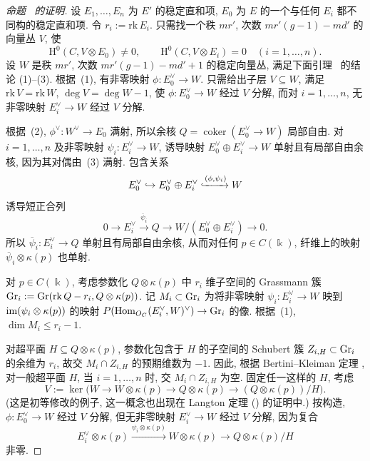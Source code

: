 \begin{proof}[命题~ 的证明]
设 $E_1,\ldots,E_n$ 为 $E'$ 的稳定直和项, $E_0$ 为 $E$ 的一个与任何 $E_i$ 都不同构的稳定直和项. 令 $r_i:=\mathrm{rk}\,E_i$. 只需找一个秩 $mr'$, 次数 $mr'(g-1)-md'$ 的向量丛 $V$, 使
\[
\mathrm H^0(C,V\otimes E_0)\neq0,\qquad\mathrm H^0(C,V\otimes E_i)=0\quad(i=1,\ldots,n).
\]
设 $W$ 是秩 $mr'$, 次数 $mr'(g-1)-md'+1$ 的稳定向量丛, 满足下面引理~ 的结论 (1)--(3). 根据~(1), 有非零映射 $\phi:E_0^\vee\to W$. 只需给出子层 $V\subseteq W$, 满足 $\mathrm{rk}\,V=\mathrm{rk}\,W$, $\deg V=\deg W-1$, 使 $\phi:E_0^\vee\to W$ 经过 $V$ 分解, 而对 $i=1,\ldots,n$, 无非零映射 $E_i^\vee\to W$ 经过 $V$ 分解.

根据~(2), $\phi^\vee:W^\vee\to E_0$ 满射, 所以余核 $Q=\operatorname{coker}(E_0^\vee\to W)$ 局部自由. 对 $i=1,\ldots,n$ 及非零映射 $\psi_i:E_i^\vee\to W$, 诱导映射 $E_0^\vee\oplus E_i^\vee\to W$ 单射且有局部自由余核, 因为其对偶由~(3) 满射. 包含关系
\[
E_0^\vee\hookrightarrow E_0^\vee\oplus E_i^\vee\xhookrightarrow{(\phi,\psi_i)}W
\]
诱导短正合列
\[
0\longrightarrow E_i^\vee\xrightarrow{\overline\psi_i}Q\longrightarrow W/(E_0^\vee\oplus E_i^\vee)\longrightarrow0.
\]
所以 $\overline\psi_i:E_i^\vee\to Q$ 单射且有局部自由余核, 从而对任何 $p\in C(\Bbbk)$, 纤维上的映射 $\overline\psi_i\otimes\kappa(p)$ 也单射.

对 $p\in C(\Bbbk)$, 考虑参数化 $Q\otimes\kappa(p)$ 中 $r_i$ 维子空间的 Grassmann 簇 $\operatorname{Gr}_i:=\operatorname{Gr}(\mathrm{rk}\,Q-r_i,Q\otimes\kappa(p))$. 记 $M_i\subset\operatorname{Gr}_i$ 为将非零映射 $\psi_i:E_i^\vee\to W$ 映到 $\operatorname{im}(\psi_i\otimes\kappa(p))$ 的映射 $P(\mathrm{Hom}_{O_C}(E_i^\vee,W)^\vee)\to\operatorname{Gr}_i$ 的像. 根据~(1), $\dim M_i\leq r_i-1$.

对超平面 $H\subseteq Q\otimes\kappa(p)$, 参数化包含于 $H$ 的子空间的 Schubert 簇 $Z_{i,H}\subset\operatorname{Gr}_i$ 的余维为 $r_i$, 故交 $M_i\cap Z_{i,H}$ 的预期维数为 $-1$. 因此, 根据 Bertini--Kleiman 定理 \cite[推论 4(i)]{Kle74}, 对一般超平面 $H$, 当 $i=1,\ldots,n$ 时, 交 $M_i\cap Z_{i,H}$ 为空. 固定任一这样的 $H$, 考虑
\[
V:=\ker\big(W\to W\otimes\kappa(p)\to Q\otimes\kappa(p)\to(Q\otimes\kappa(p))/H\big).
\]
(这是初等修改的例子, 这一概念也出现在 Langton 定理 () 的证明中.) 按构造, $\phi:E_0^\vee\to W$ 经过 $V$ 分解, 但无非零映射 $E_i^\vee\to W$ 经过 $V$ 分解, 因为复合
\[
E_i^\vee\otimes\kappa(p)\xrightarrow{\psi_i\otimes\kappa(p)}W\otimes\kappa(p)\longrightarrow Q\otimes\kappa(p)/H
\]
非零.
\end{proof}

